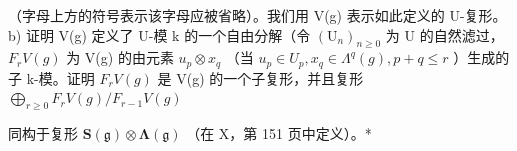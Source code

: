 （字母上方的符号表示该字母应被省略）。我们用 V(g) 表示如此定义的 U-复形。b) 证明 V(g) 定义了 U-模 k 的一个自由分解（令 \((\mathrm{U}_{n})_{n\geqslant0}\) 为 U 的自然滤过， \(F_{r}V(g)\) 为 V(g) 的由元素 \(u_{p}\otimes x_{q}\) （当 \(u_{p}\in U_{p}, x_{q}\in\Lambda^{q}(g), p+q\leqslant r\) ）生成的子 k-模。证明 \(F_{r}V(g)\) 是 V(g) 的一个子复形，并且复形 \(\bigoplus_{r\geqslant0}F_{r}V(g)/F_{r-1}V(g)\)

同构于复形 \(\mathbf{S}(\mathfrak{g})\otimes\symbf{\Lambda}(\mathfrak{g})\) （在 X，第 151 页中定义）。*
